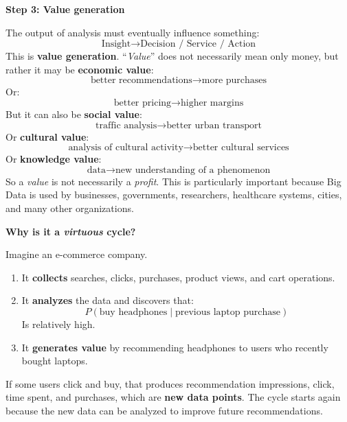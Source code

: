 \highspace
\begin{flushleft}
    \textcolor{Green3}{ \textbf{Step 3: Value generation}}
\end{flushleft}
The output of analysis must eventually influence something:
\begin{equation*}
    \text{Insight}
    \rightarrow
    \text{Decision / Service / Action}
\end{equation*}
This is \textbf{value generation}. ``\emph{Value}'' does not necessarily mean only money, but rather it may be \textbf{economic value}:
\begin{equation*}
    \text{better recommendations}
    \rightarrow
    \text{more purchases}
\end{equation*}
Or:
\begin{equation*}
    \text{better pricing}
    \rightarrow
    \text{higher margins}
\end{equation*}
But it can also be \textbf{social value}:
\begin{equation*}
    \text{traffic analysis}
    \rightarrow
    \text{better urban transport}
\end{equation*}
Or \textbf{cultural value}:
\begin{equation*}
    \text{analysis of cultural activity}
    \rightarrow
    \text{better cultural services}
\end{equation*}
Or \textbf{knowledge value}:
\begin{equation*}
    \text{data}
    \rightarrow
    \text{new understanding of a phenomenon}
\end{equation*}
So a \emph{value} is not necessarily a \emph{profit}. This is particularly important because Big Data is used by businesses, governments, researchers, healthcare systems, cities, and many other organizations.

\highspace
\begin{flushleft}
    \textcolor{Green3}{ \textbf{Why is it a \emph{virtuous} cycle?}}
\end{flushleft}
Imagine an e-commerce company.
\begin{enumerate}
    \item It \textbf{collects} searches, clicks, purchases, product views, and cart operations.
    \item It \textbf{analyzes} the data and discovers that:
        \begin{equation*}
            P(\text{buy headphones}\mid
            \text{previous laptop purchase})
        \end{equation*}
        Is relatively high.
    \item It \textbf{generates value} by recommending headphones to users who recently bought laptops.
\end{enumerate}
If some users click and buy, that produces recommendation impressions, click, time spent, and purchases, which are \textbf{new data points}. The cycle starts again because the new data can be analyzed to improve future recommendations.

